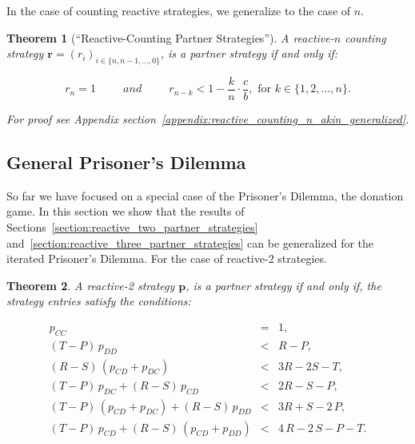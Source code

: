 \documentclass[11pt]{article}
\theoremstyle{plainCl1}
\newtheorem{theorem}{Theorem}[section]
\theoremstyle{plainCl2}
\begin{document}
In the case of counting reactive strategies, we generalize to the case of $n$.

\begin{theorem}[``Reactive-Counting Partner Strategies'']\label{theorem:reactive_counting_partner_strategies}
A reactive-$n$ counting strategy $\mathbf{r}=(r_i)_{i \in \{n, n-1, \dots, 0\}}$,
is a partner strategy if and only if:

\begin{equation}
  r_n = 1 \qquad ~~and~~ \qquad r_{n - k} < 1 - \frac{k}{n} \cdot \frac{c}{b}, \text{ for } k \in \{1, 2, \dots, n\}.
\end{equation}

For proof see Appendix section~\ref{appendix:reactive_counting_n_akin_generalized}.

\end{theorem}


\subsection{General Prisoner's Dilemma}\label{section:general_prisoners_dilemma}

So far we have focused on a special case of the Prisoner's Dilemma, the donation
game. In this section we show that the results of Sections~\ref{section:reactive_two_partner_strategies}
and~\ref{section:reactive_three_partner_strategies} can be generalized
for the iterated Prisoner's Dilemma. For the case of reactive-2 strategies.


\begin{theorem}\label{theorem:reactive_two_partner_strategies_PD}
A reactive-2 strategy $\mathbf{p}$, is a partner strategy if and only if,
the strategy entries satisfy the conditions:

\begin{equation*}
  \begin{array}{ccc}
    p_{CC} & = & 1, \\ [0.2cm]
    (T - P)\, p_{DD} & < & R - P, \\ [0.2cm]
    (R - S)\, (p_{CD} + p_{DC}) & < & 3 R - 2 S - T, \\ [0.2cm]
    (T - P)\, p_{DC}  + (R - S)\, p_{CD} & < & 2 R - S - P, \\ [0.2cm]
    (T - P)\, (p_{CD} + p_{DC}) + (R - S)\, p_{DD}  & < & 3 R + S - 2\,P, \\ [0.2cm]
    (T - P)\, p_{CD}  + (R - S)\, (p_{CD} + p_{DD}) & < & 4\,R - 2\,S - P - T.
\end{array}
\end{equation*}
\end{theorem}
\end{document}
